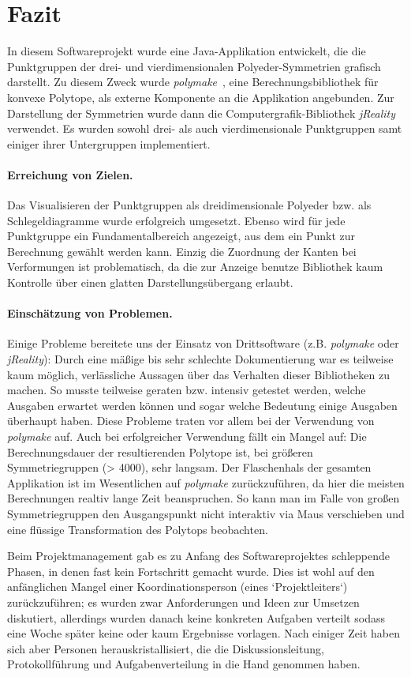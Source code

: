\section{Fazit}
In diesem Softwareprojekt wurde eine Java-Applikation entwickelt, die die Punktgruppen der drei- und vierdimensionalen
Polyeder-Symmetrien grafisch darstellt. Zu diesem Zweck wurde \emph{polymake}~\cite{polymake}, eine Berechnungsbibliothek für
konvexe Polytope, als externe Komponente an die Applikation angebunden. Zur Darstellung der Symmetrien wurde dann die Computergrafik-Bibliothek
\emph{jReality}~\cite{jreality} verwendet.
Es wurden sowohl drei- als auch vierdimensionale Punktgruppen samt einiger ihrer Untergruppen implementiert.

\paragraph{Erreichung von Zielen.}
Das Visualisieren der Punktgruppen als dreidimensionale Polyeder bzw. als Schlegeldiagramme wurde erfolgreich umgesetzt. Ebenso wird für jede Punktgruppe ein Fundamentalbereich angezeigt, aus dem ein Punkt zur Berechnung gewählt werden kann. 
Einzig die Zuordnung der Kanten bei Verformungen ist problematisch, da die zur Anzeige benutze Bibliothek kaum Kontrolle über
einen glatten Darstellungsübergang erlaubt.
\paragraph{Einschätzung von Problemen.}
Einige Probleme bereitete uns der Einsatz von Drittsoftware (z.B. \emph{polymake} oder \emph{jReality}): Durch eine mäßige bis sehr schlechte
Dokumentierung war es teilweise kaum möglich, verlässliche Aussagen über das Verhalten dieser Bibliotheken zu machen. So musste teilweise geraten bzw. intensiv getestet werden, welche Ausgaben erwartet werden können und sogar welche Bedeutung einige Ausgaben überhaupt haben. Diese Probleme traten vor allem bei der Verwendung von \emph{polymake} auf.
Auch bei erfolgreicher Verwendung fällt ein Mangel auf: Die Berechnungsdauer der resultierenden Polytope ist, bei größeren Symmetriegruppen (> 4000), sehr langsam. Der Flaschenhals der gesamten Applikation ist im Wesentlichen auf \emph{polymake} zurückzuführen, da hier die meisten Berechnungen realtiv lange Zeit beanspruchen. So kann man im Falle von großen Symmetriegruppen den Ausgangspunkt nicht interaktiv via Maus
verschieben und eine flüssige Transformation des Polytops beobachten.

\noindent Beim Projektmanagement gab es zu Anfang des Softwareprojektes schleppende Phasen, in denen fast kein Fortschritt gemacht wurde.
Dies ist wohl auf den anfänglichen Mangel einer Koordinationsperson (eines `Projektleiters`) zurückzuführen; es wurden zwar Anforderungen und
Ideen zur Umsetzen diskutiert, allerdings wurden danach keine konkreten Aufgaben verteilt sodass eine Woche später keine oder kaum Ergebnisse vorlagen. Nach einiger Zeit haben sich aber Personen herauskristallisiert, die die Diskussionsleitung, Protokollführung und Aufgabenverteilung 
in die Hand genommen haben.

